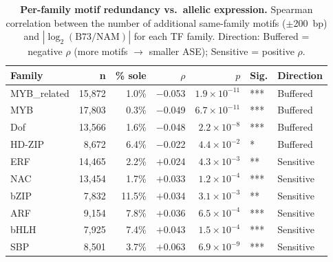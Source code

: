 \documentclass[11pt,a4paper]{article}
\begin{document}

\begin{table}[!ht]
\centering
\caption{\textbf{Per-family motif redundancy vs.\ allelic expression.} Spearman correlation between the number of additional same-family motifs ($\pm$200~bp) and $|\log_2(\text{B73/NAM})|$ for each TF family. Direction: Buffered = negative $\rho$ (more motifs $\rightarrow$ smaller ASE); Sensitive = positive $\rho$.}
\label{tab:families}
\small
\begin{tabular}{lrrrrll}
\toprule
\textbf{Family} & \textbf{n} & \textbf{\% sole} & \textbf{$\rho$} & \textbf{$p$} & \textbf{Sig.} & \textbf{Direction} \\
\midrule
MYB\_related & 15,872 & 1.0\% & $-$0.053 & $1.9 \times 10^{-11}$ & *** & Buffered \\
MYB & 17,803 & 0.3\% & $-$0.049 & $6.7 \times 10^{-11}$ & *** & Buffered \\
Dof & 13,566 & 1.6\% & $-$0.048 & $2.2 \times 10^{-8}$ & *** & Buffered \\
HD-ZIP & 8,672 & 6.4\% & $-$0.022 & $4.4 \times 10^{-2}$ & * & Buffered \\
\midrule
ERF & 14,465 & 2.2\% & $+$0.024 & $4.3 \times 10^{-3}$ & ** & Sensitive \\
NAC & 13,454 & 1.7\% & $+$0.033 & $1.2 \times 10^{-4}$ & *** & Sensitive \\
bZIP & 7,832 & 11.5\% & $+$0.034 & $3.1 \times 10^{-3}$ & ** & Sensitive \\
ARF & 9,154 & 7.8\% & $+$0.036 & $6.5 \times 10^{-4}$ & *** & Sensitive \\
bHLH & 7,925 & 7.4\% & $+$0.043 & $1.5 \times 10^{-4}$ & *** & Sensitive \\
SBP & 8,501 & 3.7\% & $+$0.063 & $6.9 \times 10^{-9}$ & *** & Sensitive \\
\bottomrule
\end{tabular}
\end{table}
\end{document}
